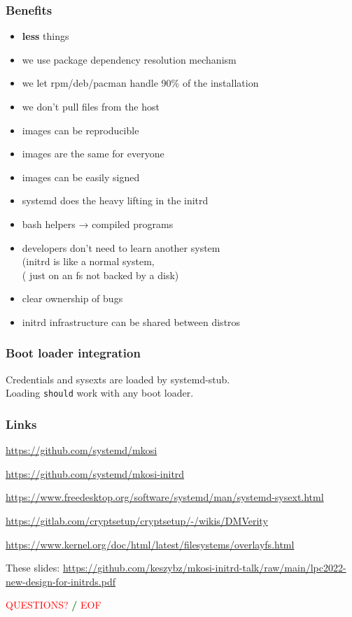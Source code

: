 \documentclass[]{beamer}
\newcommand\pp{}
\begin{document}
\begin{frame}
  \frametitle{Benefits}

  \begin{itemize}
  \item \textbf{less} things
    \pp
  \item we use package dependency resolution mechanism
    \pp
  \item we let rpm/deb/pacman handle 90\% of the installation
    \pp
  \item we don't pull files from the host
    \pp
  \item images can be reproducible
    \pp
  \item images are the same for everyone
    \pp
  \item images can be easily signed
    \pp
  \item systemd does the heavy lifting in the initrd
    \pp
  \item bash helpers → compiled programs
    \pp
  \item developers don't need to learn another system\\
    (initrd is like a normal system,\\
    \phantom( just on an fs not backed by a disk)
    \pp
  \item clear ownership of bugs
    \pp
  \item initrd infrastructure can be shared between distros
  \end{itemize}
\end{frame}

\begin{frame}
  \frametitle{Boot loader integration}

  Credentials and sysexts are loaded by systemd-stub.\\
  Loading \texttt{should} work with any boot loader.

\end{frame}

\begin{frame}[fragile]
  \frametitle{Links}

  \url{https://github.com/systemd/mkosi}

  \url{https://github.com/systemd/mkosi-initrd}

  \url{https://www.freedesktop.org/software/systemd/man/systemd-sysext.html}

  {
    \small
    \url{https://gitlab.com/cryptsetup/cryptsetup/-/wikis/DMVerity}\\
    }

  \url{https://www.kernel.org/doc/html/latest/filesystems/overlayfs.html}

  \quad

  These slides:
  \url{https://github.com/keszybz/mkosi-initrd-talk/raw/main/lpc2022-new-design-for-initrds.pdf}

  \quad
  \pp

  \hfill \textcolor{red}{QUESTIONS?} \textcolor{green}{\bf /} \textcolor{red}{EOF} \hfill{}

\end{frame}
\end{document}
